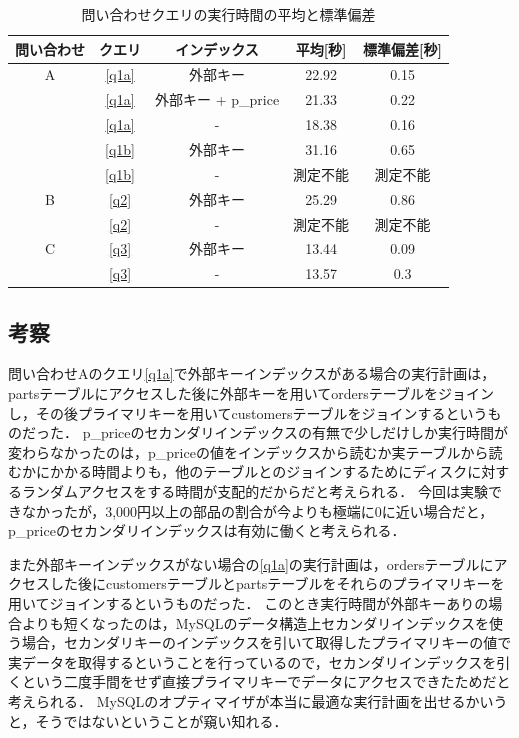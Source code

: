 \documentclass{jsarticle}
\begin{document}
\begin{table}[htb]
  \begin{center}
    \caption{問い合わせクエリの実行時間の平均と標準偏差}
    \label{result}
    \begin{tabular}{|c|c|c|c|c|}\hline
      問い合わせ & クエリ & インデックス & 平均[秒] & 標準偏差[秒] \\ \hline
      A & \ref{q1a} & 外部キー & 22.92 & 0.15 \\
        & \ref{q1a} & 外部キー + p\_price & 21.33 & 0.22 \\
        & \ref{q1a} & - & 18.38 & 0.16 \\
        & \ref{q1b} & 外部キー & 31.16 & 0.65 \\
        & \ref{q1b} & - & 測定不能 & 測定不能 \\ \hline
      B & \ref{q2} & 外部キー & 25.29 & 0.86 \\
        & \ref{q2} & - & 測定不能 & 測定不能 \\ \hline
      C & \ref{q3} & 外部キー & 13.44 & 0.09 \\
        & \ref{q3} & - & 13.57 & 0.3 \\ \hline
    \end{tabular}
  \end{center}
\end{table}

\subsection{考察}
問い合わせAのクエリ\ref{q1a}で外部キーインデックスがある場合の実行計画は，partsテーブルにアクセスした後に外部キーを用いてordersテーブルをジョインし，その後プライマリキーを用いてcustomersテーブルをジョインするというものだった．
p\_priceのセカンダリインデックスの有無で少しだけしか実行時間が変わらなかったのは，p\_priceの値をインデックスから読むか実テーブルから読むかにかかる時間よりも，他のテーブルとのジョインするためにディスクに対するランダムアクセスをする時間が支配的だからだと考えられる．
今回は実験できなかったが，3,000円以上の部品の割合が今よりも極端に0に近い場合だと，p\_priceのセカンダリインデックスは有効に働くと考えられる．

また外部キーインデックスがない場合の\ref{q1a}の実行計画は，ordersテーブルにアクセスした後にcustomersテーブルとpartsテーブルをそれらのプライマリキーを用いてジョインするというものだった．
このとき実行時間が外部キーありの場合よりも短くなったのは，MySQLのデータ構造上セカンダリインデックスを使う場合，セカンダリキーのインデックスを引いて取得したプライマリキーの値で実データを取得するということを行っているので，セカンダリインデックスを引くという二度手間をせず直接プライマリキーでデータにアクセスできたためだと考えられる．
MySQLのオプティマイザが本当に最適な実行計画を出せるかいうと，そうではないということが窺い知れる．
\end{document}
